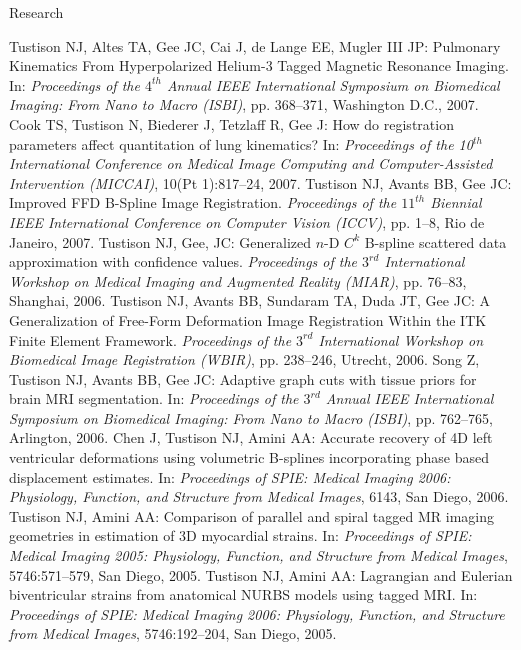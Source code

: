 \documentclass{resume}
\begin{document}
\begin{category}{Research}
\begin{itemize}
    \citemnobullet    Tustison NJ, Altes TA, Gee JC, Cai J, de Lange EE, Mugler III JP: Pulmonary Kinematics From Hyperpolarized Helium-3 Tagged Magnetic Resonance Imaging. In: {\em Proceedings of the $4^{th}$ Annual IEEE International Symposium on Biomedical Imaging: From Nano to Macro (ISBI)}, pp. 368--371, Washington D.C., 2007.
    \citemnobullet  Cook TS, Tustison N, Biederer J, Tetzlaff R, Gee J: How do registration parameters affect quantitation of lung kinematics? In:  {\em Proceedings of the 10$^{th}$ International Conference on Medical Image Computing and Computer-Assisted Intervention (MICCAI)}, 10(Pt 1):817--24, 2007.
    \citemnobullet Tustison NJ, Avants BB, Gee JC: Improved FFD B-Spline Image Registration. {\em Proceedings of the $11^{th}$ Biennial IEEE International Conference on Computer Vision (ICCV)}, pp. 1--8, Rio de Janeiro, 2007.
    \citemnobullet  Tustison NJ, Gee, JC: Generalized $n$-D $C^k$ B-spline scattered data approximation with confidence values. {\em Proceedings of the $3^{rd}$ International Workshop on Medical Imaging and Augmented Reality (MIAR)}, pp. 76--83, Shanghai, 2006.
    \citemnobullet  Tustison NJ, Avants BB, Sundaram TA, Duda JT, Gee JC: A Generalization of Free-Form Deformation Image Registration Within the ITK Finite Element Framework. {\em Proceedings of the $3^{rd}$ International Workshop on Biomedical Image Registration (WBIR)}, pp. 238--246, Utrecht, 2006.
    \citemnobullet  Song Z, Tustison NJ, Avants BB, Gee JC: Adaptive graph cuts with tissue priors for brain MRI segmentation. In:  {\em Proceedings of the $3^{rd}$ Annual IEEE International Symposium on Biomedical Imaging: From Nano to Macro (ISBI)}, pp. 762--765, Arlington, 2006.
    \citemnobullet  Chen J, Tustison NJ, Amini AA: Accurate recovery of 4D left ventricular deformations using volumetric B-splines incorporating phase based displacement estimates. In: {\em Proceedings of SPIE:  Medical Imaging 2006:  Physiology, Function, and Structure from Medical Images}, 6143, San Diego, 2006.
    \citemnobullet  Tustison NJ, Amini AA: Comparison of parallel and spiral tagged MR imaging geometries in estimation of 3D myocardial strains. In: {\em Proceedings of SPIE:  Medical Imaging 2005:  Physiology, Function, and Structure from Medical Images}, 5746:571--579, San Diego, 2005.
    \citemnobullet  Tustison NJ, Amini AA: Lagrangian and Eulerian biventricular strains from anatomical NURBS models using tagged MRI. In: {\em Proceedings of SPIE:  Medical Imaging 2006:  Physiology, Function, and Structure from Medical Images},  5746:192--204, San Diego, 2005.

\end{itemize}
\end{category}
\end{document}
